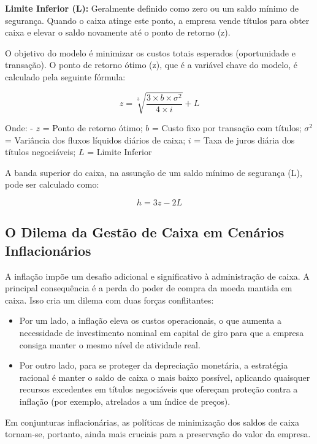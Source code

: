 \documentclass[
  a4paper,
]{book}
\begin{document}
\textbf{Limite Inferior (L):} Geralmente definido como zero ou um saldo
mínimo de segurança. Quando o caixa atinge este ponto, a empresa vende
títulos para obter caixa e elevar o saldo novamente até o ponto de
retorno (z).

O objetivo do modelo é minimizar os custos totais esperados
(oportunidade e transação). O ponto de retorno ótimo (z), que é a
variável chave do modelo, é calculado pela seguinte fórmula:

\[z = \sqrt[3]{\frac{3 \times b \times \sigma^2}{4 \times i}} + L\]

Onde: - \(z\) = Ponto de retorno ótimo; \(b\) = Custo fixo por transação
com títulos; \(\sigma^2\) = Variância dos fluxos líquidos diários de
caixa; \(i\) = Taxa de juros diária dos títulos negociáveis; \(L\) =
Limite Inferior

A banda superior do caixa, na assunção de um saldo mínimo de segurança
(L), pode ser calculado como:

\[h = 3z - 2L\]

\subsection{O Dilema da Gestão de Caixa em Cenários
Inflacionários}\label{o-dilema-da-gestuxe3o-de-caixa-em-cenuxe1rios-inflacionuxe1rios}

A inflação impõe um desafio adicional e significativo à administração de
caixa. A principal consequência é a perda do poder de compra da moeda
mantida em caixa. Isso cria um dilema com duas forças conflitantes:

\begin{itemize}
\item
  Por um lado, a inflação eleva os custos operacionais, o que aumenta a
  necessidade de investimento nominal em capital de giro para que a
  empresa consiga manter o mesmo nível de atividade real.
\item
  Por outro lado, para se proteger da depreciação monetária, a
  estratégia racional é manter o saldo de caixa o mais baixo possível,
  aplicando quaisquer recursos excedentes em títulos negociáveis que
  ofereçam proteção contra a inflação (por exemplo, atrelados a um
  índice de preços).
\end{itemize}

Em conjunturas inflacionárias, as políticas de minimização dos saldos de
caixa tornam-se, portanto, ainda mais cruciais para a preservação do
valor da empresa.

\end{document}
